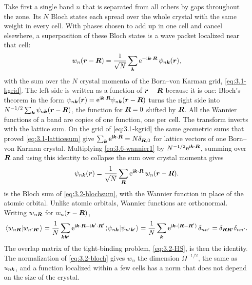 Take first a single band $n$ that is separated from all others by gaps throughout the zone. Its $N$ Bloch states each spread over the whole crystal with the same weight in every cell. With phases chosen to add up in one cell and cancel elsewhere, a superposition of these Bloch states is a wave packet localized near that cell:
\begin{equation}
  w_n(\bm{r} - \bm{R}) = \frac{1}{\sqrt N}\sum_{\bm{k}}\mathrm{e}^{-\mathrm{i}\bm{k}\cdot\bm{R}}\,\psi_{n\bm{k}}(\bm{r}) ,
  \label{eq:3.6-wannier1}
\end{equation}
with the sum over the $N$ crystal momenta of the Born--von Karman grid, \cref{eq:3.1-kgrid}. The left side is written as a function of $\bm{r} - \bm{R}$ because it is one: Bloch's theorem in the form $\psi_{n\bm{k}}(\bm{r}) = \mathrm{e}^{\mathrm{i}\bm{k}\cdot\bm{R}}\psi_{n\bm{k}}(\bm{r} - \bm{R})$ turns the right side into $N^{-1/2}\sum_{\bm{k}}\psi_{n\bm{k}}(\bm{r} - \bm{R})$, the function for $\bm{R} = 0$ shifted by $\bm{R}$. All the Wannier functions of a band are copies of one function, one per cell. The transform inverts with the lattice sum. On the grid of \cref{eq:3.1-kgrid} the same geometric sums that proved \cref{eq:3.1-latticesum} give $\sum_{\bm{k}}\mathrm{e}^{\mathrm{i}\bm{k}\cdot\bm{R}} = N\delta_{\bm{R},0}$ for lattice vectors of one Born--von Karman crystal. Multiplying \cref{eq:3.6-wannier1} by $N^{-1/2}\mathrm{e}^{\mathrm{i}\bm{k}\cdot\bm{R}}$, summing over $\bm{R}$ and using this identity to collapse the sum over crystal momenta gives
\begin{equation}
  \psi_{n\bm{k}}(\bm{r}) = \frac{1}{\sqrt N}\sum_{\bm{R}}\mathrm{e}^{\mathrm{i}\bm{k}\cdot\bm{R}}\,w_n(\bm{r} - \bm{R}) .
  \label{eq:3.6-inverse}
\end{equation}
 is the Bloch sum of \cref{eq:3.2-blochsum}, with the Wannier function in place of the atomic orbital. Unlike atomic orbitals, Wannier functions are orthonormal. Writing $w_{n\bm{R}}$ for $w_n(\bm{r} - \bm{R})$,
\begin{equation*}
  \langle w_{n\bm{R}}|w_{n'\bm{R}'}\rangle = \frac1N\sum_{\bm{k}\bm{k}'}\mathrm{e}^{\mathrm{i}\bm{k}\cdot\bm{R} - \mathrm{i}\bm{k}'\cdot\bm{R}'}\langle\psi_{n\bm{k}}|\psi_{n'\bm{k}'}\rangle
  = \frac1N\sum_{\bm{k}}\mathrm{e}^{\mathrm{i}\bm{k}\cdot(\bm{R} - \bm{R}')}\,\delta_{nn'} = \delta_{\bm{R}\bm{R}'}\delta_{nn'} .
\end{equation*} The overlap matrix of the tight-binding problem, \cref{eq:3.2-HS}, is then the identity. The normalization of \cref{eq:3.2-bloch} gives $w_n$ the dimension $\Omega^{-1/2}$, the same as $u_{n\bm{k}}$, and a function localized within a few cells has a norm that does not depend on the size of the crystal.

